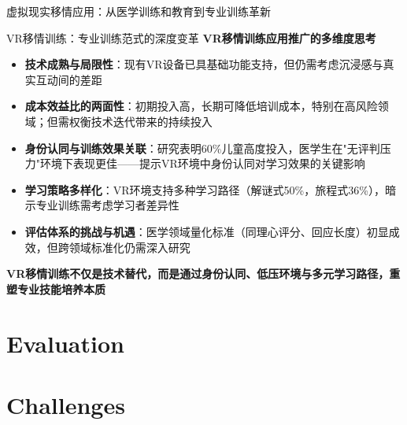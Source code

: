 \documentclass[aspectratio=169,xcolor=dvipsnames]{beamer}
\begin{document}
\begin{frame}{虚拟现实移情应用：从医学训练和教育到专业训练革新}
    \begin{block}{VR移情训练：专业训练范式的深度变革}
        \textbf{VR移情训练应用推广的多维度思考}
        \begin{itemize}
            \item \textbf{技术成熟与局限性}：现有VR设备已具基础功能支持，但仍需考虑沉浸感与真实互动间的差距
            \item \textbf{成本效益比的两面性}：初期投入高，长期可降低培训成本，特别在高风险领域；但需权衡技术迭代带来的持续投入
            \item \textbf{身份认同与训练效果关联}：研究表明60\%儿童高度投入，医学生在"无评判压力"环境下表现更佳——提示VR环境中身份认同对学习效果的关键影响
            \item \textbf{学习策略多样化}：VR环境支持多种学习路径（解谜式50\%，旅程式36\%），暗示专业训练需考虑学习者差异性
            \item \textbf{评估体系的挑战与机遇}：医学领域量化标准（同理心评分、回应长度）初显成效，但跨领域标准化仍需深入研究
        \end{itemize}
        
        \vspace{0.1cm}
        \textbf{VR移情训练不仅是技术替代，而是通过身份认同、低压环境与多元学习路径，重塑专业技能培养本质}
    \end{block}
\end{frame}

\section{Evaluation}

\section{Challenges}
\end{document}
